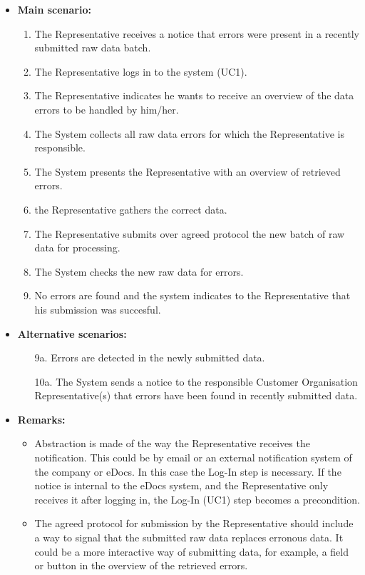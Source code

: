 \documentclass[a4paper,10pt]{article}
\begin{document}
\begin{itemize}
    \item \textbf{Main scenario:} 
    \begin{enumerate}
       \item The Representative receives a notice that errors were present in a recently submitted raw data batch.
       \item The Representative logs in to the system (UC1).
       \item The Representative indicates he wants to receive an overview of the data errors to be handled by him/her.
       \item The System collects all raw data errors for which the Representative is responsible.
       \item The System presents the Representative with an overview of retrieved errors.
       \item the Representative gathers the correct data.
       \item The Representative submits over agreed protocol the new batch of raw data for processing.
       \item The System checks the new raw data for errors.
       \item No errors are found and the system indicates to the Representative that his submission was succesful.
    \end{enumerate}

    \item \textbf{Alternative scenarios:} 
    \begin{enumerate}
        \item [9a.] Errors are detected in the newly submitted data.
        \item [10a.] The System sends a notice to the responsible Customer Organisation Representative(s) that errors have been found in recently submitted data.
    \end{enumerate}
    
    \item \textbf{Remarks:}
        \begin{itemize}
            \item Abstraction is made of the way the Representative receives the notification. This could be by email or an external notification system of the company or eDocs. In this case the Log-In step is necessary. If the notice is internal to the eDocs system, and the Representative only receives it after logging in, the Log-In (UC1) step becomes a precondition.
            \item The agreed protocol for submission by the Representative should include a way to signal that the submitted raw data replaces erronous data. It could be a more interactive way of submitting data, for example, a field or button in the overview of the retrieved errors.
        \end{itemize}
\end{itemize}
\end{document}
